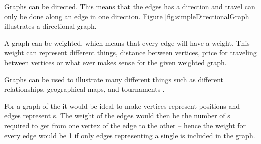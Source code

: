 Graphs can be directed. This means that the edges has a direction and travel can only be done along an edge in one direction. Figure \ref{fig:simpleDirectionalGraph} illustrates a directional graph. 

A graph can be weighted, which means that every edge will have a weight.
This weight can represent different things, distance between vertices, price for traveling between vertices or what ever makes sense for the given weighted graph.

\begin{figure}[htb]
	\centering
		\hspace{0.2\textwidth}
		\hspace{0.2\textwidth}
		\caption{}
		\label{fig:exampleGraphs}
\end{figure}

Graphs can be used to illustrate many different things such as different relationships, geographical maps, and tournaments \cite[pp. 592-593]{Rosen07}. 

For a graph of the \rubik{} it would be ideal to make vertices represent positions and edges represent \twist{}s. The weight of the edges would then be the number of \twist{}s required to get from one vertex of the edge to the other -- hence the weight for every edge would be 1 if only edges representing a single \twist{} is included in the graph.

